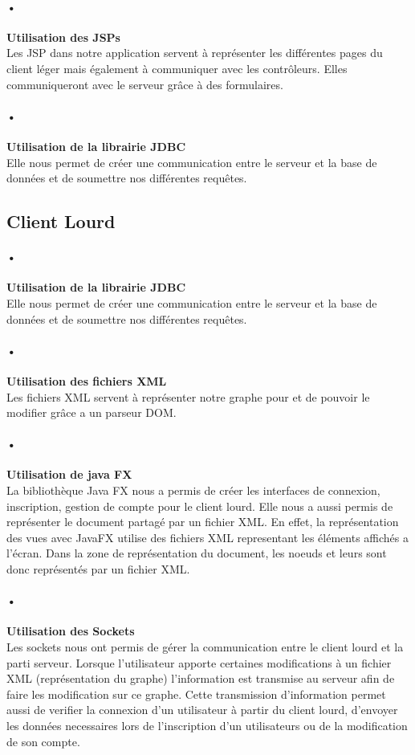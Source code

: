 \documentclass[11pt,a4paper]{article}
\begin{document}
\paragraph{•}
\textbf{Utilisation des JSPs}\\
Les JSP dans notre application servent à représenter les différentes pages du client léger mais également à communiquer avec les contrôleurs. Elles communiqueront avec le serveur grâce à des formulaires.

\paragraph{•}
\textbf{Utilisation de la librairie JDBC}\\
Elle nous permet de créer une communication entre le serveur et la base de données et de soumettre nos différentes requêtes.

\subsection{Client Lourd}
\paragraph{•}
\textbf{Utilisation de la librairie JDBC}\\
Elle nous permet de créer une communication entre le serveur et la base de données et de soumettre nos différentes requêtes.
\paragraph{•}
\textbf{Utilisation des fichiers XML}\\
Les fichiers XML servent à représenter notre graphe pour et de pouvoir
le modifier grâce a un parseur DOM.

\paragraph{•}
\textbf{Utilisation de java FX}\\
La bibliothèque Java FX nous a permis de créer les interfaces de
connexion, inscription, gestion de compte pour le client lourd. Elle
nous a aussi permis de représenter le document partagé par un fichier
XML. En effet, la représentation des vues avec JavaFX utilise des
fichiers XML representant les éléments affichés a l'écran. Dans la
zone de représentation du document, les noeuds et leurs sont donc représentés
par un fichier XML.
\paragraph{•}
\textbf{Utilisation des Sockets}\\
Les sockets nous ont permis de gérer la communication entre le client
lourd et la parti serveur. Lorsque l'utilisateur apporte certaines
modifications à un fichier XML (représentation du graphe)
l'information est transmise au serveur afin de faire les modification
sur ce graphe. Cette transmission d'information permet aussi de
verifier la connexion d'un utilisateur à partir du client lourd,
d'envoyer les données necessaires lors de l'inscription d'un
utilisateurs ou de la modification de son compte.
\end{document}
